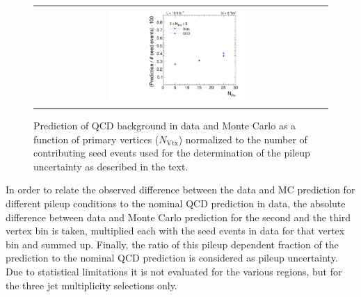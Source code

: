\begin{figure}[!t]
  \centering
  \begin{tabular}{cc}
                \includegraphics[width=0.49\textwidth]{figures/PUUncertainty_NJet3_5.pdf}%
  \end{tabular}
  \caption{Prediction of QCD background in data and Monte Carlo as a function of primary vertices ($N_\mathrm{Vtx}$) normalized to the number of contributing seed events used for the determination of the pileup uncertainty as described in the text.}
  \label{fig:qcd_rs_pileup}
\end{figure}
In order to relate the observed difference between the data and MC prediction for different pileup conditions to the nominal QCD prediction in data, the absolute difference between data and Monte Carlo prediction for the second and the third vertex bin is taken, multiplied each with the seed events in data for that vertex bin and summed up.  %
Finally, the ratio of this pileup dependent fraction of the prediction to the nominal QCD prediction is considered as pileup uncertainty. Due to statistical limitations it is not evaluated for the various \HT regions, but for the three jet multiplicity selections only. 

